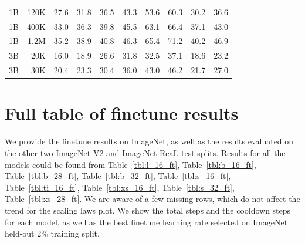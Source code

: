 \begin{table}[t]
\begin{tabulary}{1.0\textwidth}{l r c c c c c c c c}
1B    & 120K  & 27.6 & 31.8 & 36.5 & 43.3 & 53.6 & 60.3 & 30.2 & 36.6 \\
1B    & 400K  & 33.0 & 36.3 & 39.8 & 45.5 & 63.1 & 66.4 & 37.1 & 43.0 \\
1B    & 1.2M  & 35.2 & 38.9 & 40.8 & 46.3 & 65.4 & 71.2 & 40.2 & 46.9 \\
\midrule[0.25pt]
3B    & 20K   & 16.0 & 18.9 & 26.6 & 31.8 & 32.5 & 37.1 & 18.6 & 23.2 \\
3B    & 30K   & 20.4 & 23.3 & 30.4 & 36.0 & 43.0 & 46.2 & 21.7 & 27.0 \\
    \bottomrule
  \end{tabulary}
\end{table}



\section{Full table of finetune results}\label{sec:app:table}
We provide the finetune results on ImageNet, as well as the results evaluated on the other two ImageNet V2 and ImageNet ReaL test splits. Results for all the models could be found from Table~\ref{tbl:l_16_ft}, Table~\ref{tbl:b_16_ft}, Table~\ref{tbl:b_28_ft}, Table~\ref{tbl:b_32_ft}, Table~\ref{tbl:s_16_ft}, Table~\ref{tbl:ti_16_ft}, Table~\ref{tbl:xs_16_ft}, Table~\ref{tbl:s_32_ft}, Table~\ref{tbl:xs_28_ft}. 
We are aware of a few missing rows, which do not affect the trend for the scaling laws plot. 
We show the total steps and the cooldown steps for each model, as well as the best finetune learning rate selected on ImageNet held-out 2\% training split.


